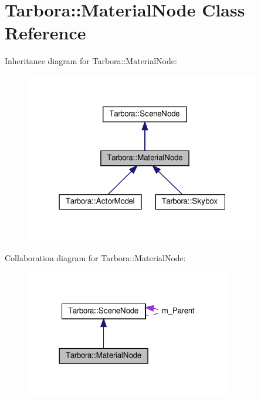 \hypertarget{classTarbora_1_1MaterialNode}{}\section{Tarbora\+:\+:Material\+Node Class Reference}
\label{classTarbora_1_1MaterialNode}


Inheritance diagram for Tarbora\+:\+:Material\+Node\+:
\nopagebreak
\begin{figure}[H]
\begin{center}
\leavevmode
\includegraphics[width=292pt]{classTarbora_1_1MaterialNode__inherit__graph}
\end{center}
\end{figure}


Collaboration diagram for Tarbora\+:\+:Material\+Node\+:
\nopagebreak
\begin{figure}[H]
\begin{center}
\leavevmode
\includegraphics[width=254pt]{classTarbora_1_1MaterialNode__coll__graph}
\end{center}
\end{figure}
